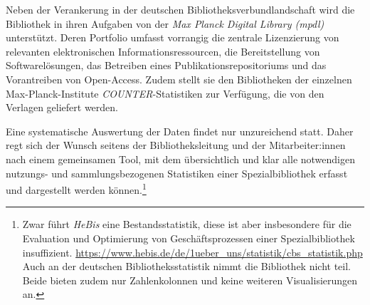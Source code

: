 Neben der Verankerung in der deutschen Bibliotheksverbundlandschaft
wird die Bibliothek in ihren Aufgaben von der
\textit{Max Planck Digital Library (mpdl)}
unterstützt. Deren Portfolio umfasst vorrangig die zentrale Lizenzierung
von relevanten elektronischen Informationsressourcen, die Bereitstellung
von Softwarelösungen, das Betreiben eines Publikationsrepositoriums und
das Vorantreiben von Open-Access. Zudem stellt sie den Bibliotheken der einzelnen Max-Planck-Institute
\textit{COUNTER}-Statistiken zur Verfügung, die von den Verlagen geliefert werden.



Eine systematische Auswertung der Daten findet nur unzureichend statt.
Daher regt sich der Wunsch seitens der Bibliotheksleitung und der Mitarbeiter:innen nach einem gemeinsamen Tool,
mit dem übersichtlich und klar alle notwendigen nutzungs- und sammlungsbezogenen Statistiken einer
Spezialbibliothek erfasst und dargestellt werden können.\footnote{Zwar führt \textit{HeBis} eine Bestandsstatistik, diese ist aber insbesondere für die
Evaluation und Optimierung von Geschäftsprozessen einer Spezialbibliothek
insuffizient. \url{https://www.hebis.de/de/1ueber_uns/statistik/cbs_statistik.php} 
Auch an der deutschen Bibliotheksstatistik nimmt die Bibliothek nicht teil. Beide bieten zudem nur Zahlenkolonnen und keine weiteren Visualisierungen an.}

